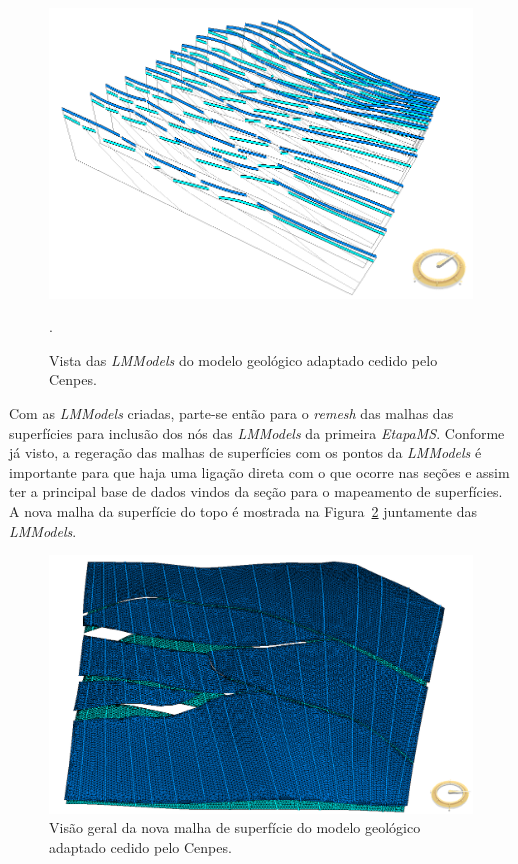\begin{figure} [H]
  \begin{center}
    \includegraphics[width=320pt]{images/fig-lmmodel-ms}
    \caption{Vista das \textit{LMModels} do modelo geológico adaptado cedido pelo Cenpes.}.\label{fig-example-2-3}
  \end{center}
\end{figure}

Com as \textit{LMModels} criadas, parte-se então para o \textit{remesh} das malhas das superfícies para inclusão dos nós das \textit{LMModels} da primeira \textit{EtapaMS}. Conforme já visto, a regeração das malhas de superfícies com os pontos da \textit{LMModels} é importante para que haja uma ligação direta com o que ocorre nas seções e assim ter a principal base de dados vindos da seção para o mapeamento de superfícies. A nova malha da superfície do topo é mostrada na Figura~\ref{fig-example-2-4} juntamente das \textit{LMModels}.

\begin{figure} [h]
  \begin{center}
    \includegraphics[width=\textwidth]{images/fig-example-2-3}
    \caption{Visão geral da nova malha de superfície do modelo geológico adaptado cedido pelo Cenpes.}\label{fig-example-2-4}
  \end{center}
\end{figure}

